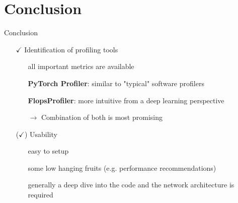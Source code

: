 \documentclass[compress,aspectratio=169]{beamer}
\begin{document}
\section{Conclusion}
\sectionIntro %

\begin{frame}{Conclusion}
\begin{itemize}
    \item[$\checkmark$] Identification of profiling tools
    \begin{itemize}
        \item[\textcolor{c3}{\textbullet}] all important metrics are available
        \item[\textcolor{c3}{\textbullet}] \textbf{PyTorch Profiler}: similar to "typical" software profilers
        \item[\textcolor{c3}{\textbullet}] \textbf{FlopsProfiler}: more intuitive from a deep learning perspective
        \item[$\rightarrow$] Combination of both is most promising
    \end{itemize}
    \vspace{1cm}
    \item[($\checkmark$)] Usability
    \begin{itemize}
        \item[\textcolor{c3}{\textbullet}] easy to setup
        \item[\textcolor{c3}{\textbullet}] some low hanging fruits (e.g. performance recommendations)
        \item[\textcolor{c1}{\textbullet}] generally a deep dive into the code and the network architecture is required
    \end{itemize}
\end{itemize}
\end{frame}
\end{document}
